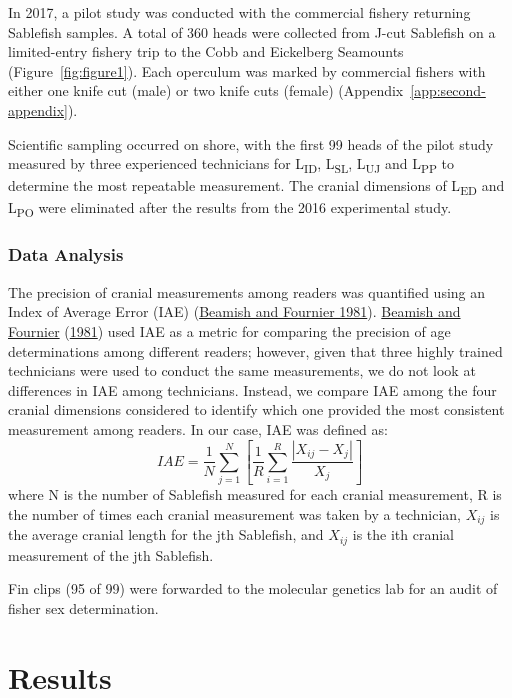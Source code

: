 \documentclass[12pt]{article}\usepackage[]{graphicx}\usepackage[]{color}
\begin{document}
In 2017, a pilot study was conducted with the commercial fishery returning Sablefish samples. A total of 360 heads were collected from J-cut Sablefish on a limited-entry fishery trip to the Cobb and Eickelberg Seamounts (Figure~\ref{fig:figure1}). Each operculum was marked by commercial fishers with either one knife cut (male) or two knife cuts (female) (Appendix~\ref{app:second-appendix}).

Scientific sampling occurred on shore, with the first 99 heads of the pilot study measured by three experienced technicians for L\textsubscript{ID}, L\textsubscript{SL}, L\textsubscript{UJ} and L\textsubscript{PP} to determine the most repeatable measurement. The cranial dimensions of L\textsubscript{ED} and L\textsubscript{PO} were eliminated after the results from the 2016 experimental study.

\hypertarget{data-analysis-1}{%
\subsubsection{Data Analysis}\label{data-analysis-1}}

The precision of cranial measurements among readers was quantified using an Index of Average Error (IAE) (\protect\hyperlink{ref-Beamish1981}{Beamish and Fournier 1981}). \protect\hyperlink{ref-Beamish1981}{Beamish and Fournier} (\protect\hyperlink{ref-Beamish1981}{1981}) used IAE as a metric for comparing the precision of age determinations among different readers; however, given that three highly trained technicians were used to conduct the same measurements, we do not look at differences in IAE among technicians. Instead, we compare IAE among the four cranial dimensions considered to identify which one provided the most consistent measurement among readers. In our case, IAE was defined as: \[
IAE=\frac{1}{N}\sum_{j = 1}^{N}\left[\frac{1}{R}\sum_{i = 1}^{R}\frac{|X_{ij} - X_j|}{X_j}\right]
\] where N is the number of Sablefish measured for each cranial measurement, R is the number of times each cranial measurement was taken by a technician, \(X_{ij}\) is the average cranial length for the jth Sablefish, and \(X_{ij}\) is the ith cranial measurement of the jth Sablefish.

Fin clips (95 of 99) were forwarded to the molecular genetics lab for an audit of fisher sex determination.

\hypertarget{results}{%
\section{Results}\label{results}}
\end{document}
